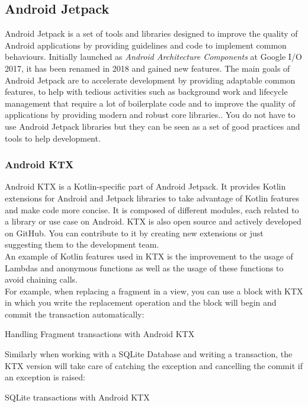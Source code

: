 \documentclass[twoside, openright,11pt,a4paper]{book}
\newenvironment{code}{\captionsetup{type=listing}}{}
\begin{document}
\subsection{Android Jetpack}
Android Jetpack is a set of tools and libraries designed to improve the quality of Android applications by providing guidelines and code to implement common behaviours. Initially launched as \emph{Android Architecture Components} at Google I/O 2017, it has been renamed in 2018 and gained new features. The main goals of Android Jetpack are to accelerate development by providing adaptable common features, to help with tedious activities such as background work and lifecycle management that require a lot of boilerplate code\cite{wiki:define:boilerplate} and to improve the quality of applications by providing modern and robust core libraries.\cite{android:doc:jetpack}. You do not have to use Android Jetpack libraries but they can be seen as a set of good practices and tools to help development.
\subsubsection{Android KTX}
\label{ktx_section}
Android KTX is a Kotlin-specific part of Android Jetpack. It provides Kotlin extensions for Android and Jetpack libraries to take advantage of Kotlin features and make code more concise\cite{android:doc:ktx}. It is composed of different modules, each related to a library or use case on Android. KTX is also open source and actively developed on GitHub\cite{github:android:ktx}. You can contribute to it by creating new extensions or just suggesting them to the development team.\\

An example of Kotlin features used in KTX is the improvement to the usage of Lambdas and anonymous functions as well as the usage of these functions to avoid chaining calls.\\

For example, when replacing a fragment in a view, you can use a block with KTX in which you write the replacement operation and the block will begin and commit the transaction automatically:
\begin{code}
\caption{Handling Fragment transactions with Android KTX}	
\end{code}


Similarly when working with a SQLite Database and writing a transaction, the KTX version will take care of catching the exception and cancelling the commit if an exception is raised:
\begin{code}
\caption{SQLite transactions with Android KTX}	
\end{code}
\end{document}
